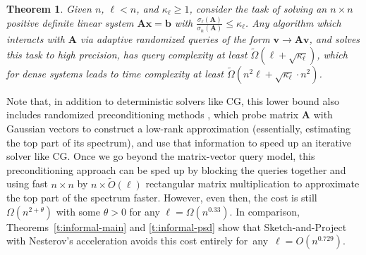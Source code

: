 \documentclass[11pt]{article}
\def\x{{\mathbf x}}
\def\v{{\mathbf v}}
\def\b{{\mathbf b}}
\def\A{{\mathbf A}}
\newtheorem{thm}{Theorem}
\begin{document}
\begin{thm}\label{t:informal-lower} 
    Given $n$, $\ell<n$, and $\kappa_\ell\geq 1$, consider the task of solving an $n\times n$ positive definite linear system $\A\x=\b$ with $\frac{\sigma_{\ell}(\A)}{\sigma_n(\A)}\leq\kappa_\ell$. Any algorithm which interacts with $\A$ via adaptive randomized queries  of the form $\v\rightarrow \A\v$, and solves this task to high precision, has query complexity at least $\tilde\Omega(\ell+\sqrt{\kappa_\ell})$, which for dense systems leads to time complexity at least $\tilde\Omega(n^2\ell + \sqrt{\kappa_\ell}\cdot n^2)$.
\end{thm}
 Note that, in addition to deterministic solvers like CG, this lower bound also includes randomized preconditioning methods \cite{martinsson2020randomized}, which probe matrix $\A$ with Gaussian vectors to construct a low-rank approximation (essentially, estimating the top part of its spectrum), and use that information to speed up an iterative solver like CG. Once we go beyond the matrix-vector query model, this preconditioning approach can be sped up by blocking the queries together and using fast $n\times n$ by $n\times \tilde O(\ell)$ rectangular matrix multiplication \cite{le2012faster} to approximate the top part of the spectrum faster. However, even then, the cost is still $\Omega(n^{2+\theta})$ with some $\theta > 0$ for any $\ell=\Omega(n^{0.33})$. In comparison, Theorems~\ref{t:informal-main} and \ref{t:informal-psd} show that Sketch-and-Project with Nesterov's acceleration avoids this cost entirely for~any~$\ell=O(n^{0.729})$. 
\end{document}
